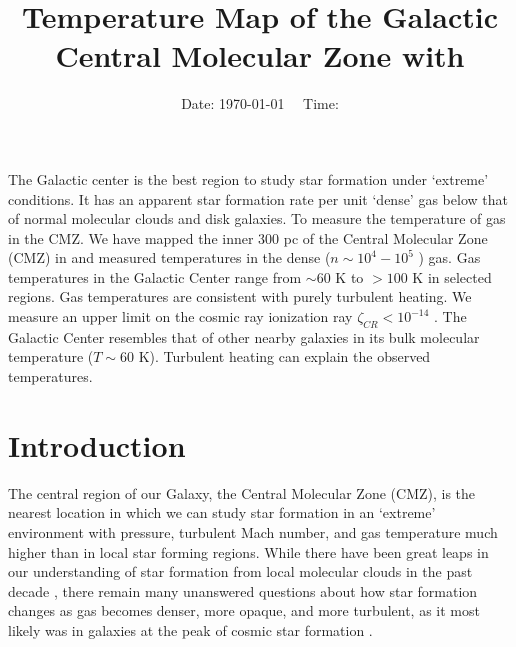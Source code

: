 



\title{Temperature Map of the Galactic Central Molecular Zone with \formaldehyde}


\date{Date: \today ~~ Time: \currenttime}

\abstract
{The Galactic center is the best region to study star formation under `extreme'
conditions.  It has an apparent star formation rate per unit `dense' gas below
that of normal molecular clouds and disk galaxies.}
{To measure the temperature of gas in the CMZ.}
{We have mapped the inner 300 pc of the Central Molecular Zone (CMZ) in \para
and measured temperatures in the dense ($n\sim10^4-10^5$ \percc) gas.}
{Gas temperatures in the Galactic Center range from $\sim60$ K to $>100$ K in
selected regions.  Gas temperatures are consistent with purely turbulent heating.
We measure an upper limit on the cosmic ray ionization ray
$\zeta_{CR}<10^{-14}$ \pers.}
{The Galactic Center resembles that of other nearby galaxies in its bulk molecular
temperature ($T\sim60$ K).  Turbulent heating can explain the observed temperatures.}



\maketitle


\section{Introduction}
The central region of our Galaxy, the Central Molecular Zone (CMZ), is the
nearest location in which we can study star formation in an `extreme'
environment with pressure, turbulent Mach number, 
and gas temperature much higher than in local star forming regions.  While
there have been great leaps in our understanding of star formation
from local molecular clouds in the past decade
\citep{Lada2012a,Heiderman2010a,Lada2010a}, there remain many unanswered
questions about how star formation changes as gas becomes denser, more opaque,
and more turbulent, as it most likely was in galaxies at the peak of cosmic
star formation \citep{Kruijssen2013a}.


